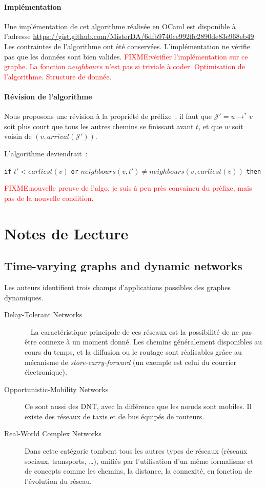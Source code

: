 \documentclass[12pt,a4paper]{article}
\begin{document}
\paragraph{Implémentation}
Une implémentation de cet algorithme réalisée en OCaml est disponible
à l'adresse
\url{https://gist.github.com/MisterDA/6dfb9740ce992ffc2890de83e968eb49}. Les
contraintes de l'algorithme ont été conservées. L'implémentation ne
vérifie pas que les données sont bien
valides. \textcolor{red}{FIXME:\@ vérifier l'implémentation sur ce
  graphe. La fonction \(neighbours\) n'est pas si triviale à
  coder. Optimisation de l'algorithme. Structure de donnée.}

\paragraph{Révision de l'algorithme}
Nous proposons une révision à la propriété de préfixe~: il faut que
\(\mathcal{J}' = u \rightarrow^* v\) soit plus court que tous les
autres chemins se finissant avant \(t\), et que \(w\) soit voisin de
\((v, arrival(\mathcal{J}'))\).

L'algorithme deviendrait~:
\begin{center}
  \verb|if| \(t' < earliest(v)\) \verb|or|
  \(neighbours(v, t') \neq neighbours(v, earliest(v))\) \verb|then|
\end{center}

\textcolor{red}{FIXME:\@ nouvelle preuve de l'algo, je suis à peu près
  convaincu du préfixe, mais pas de la nouvelle condition.}

\section{Notes de Lecture}
\subsection{Time-varying graphs and dynamic
  networks~\cite{casteigts2012time}}
Les auteurs identifient trois champs d'applications possibles des
graphes dynamiques.
\begin{description}
\item[Delay-Tolerant Networks]~\cite{fall2007delay} La caractéristique
  principale de ces réseaux est la possibilité de ne pas être connexe
  à un moment donné. Les chemins généralement disponibles au cours du
  temps, et la diffusion ou le routage sont réalisables grâce au
  mécanisme de \textit{store-carry-forward} (un exemple est celui du
  courrier électronique).
\item[Opportunistic-Mobility Networks] Ce sont aussi des DNT, avec la
  différence que les nœuds sont mobiles. Il existe des réseaux de
  taxis et de bus équipés de routeurs.
\item[Real-World Complex Networks] Dans cette catégorie tombent tous
  les autres types de réseaux (réseaux sociaux, transports, …),
  unifiés par l'utilisation d'un même formalisme et de concepts comme
  les chemins, la distance, la connexité, en fonction de l'évolution
  du réseau.
\end{description}
\end{document}
